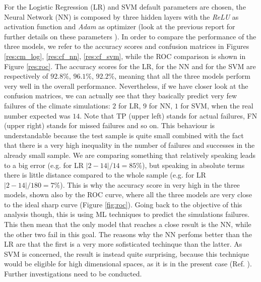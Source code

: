 \documentclass[english,notitlepage,reprint,nofootinbib]{revtex4-1}  %
\begin{document}
For the Logistic Regression (LR) and SVM default parameters are chosen, the Neural Network (NN) is composed by three hidden layers with the \textit{ReLU} as activation function and \textit{Adam} as optimizer (look at the previous report for further details on these parameters \cite{adele}). In order to compare the performance of the three models, we refer to the accuracy scores and confusion matrices in Figures \ref{res:cm_log}, \ref{res:cf_nn}, \ref{res:cf_svm}, while the ROC comparison is shown in Figure \ref{res:roc}. The accuracy scores for the LR, for the NN and for the SVM are respectively of $92.8\%$, $96.1\%$, $92.2\%$, meaning that all the three models perform very well in the overall performance. Nevertheless, if we have closer look at the confusion matrices, we can actually see that they basically predict very few failures of the climate simulations: $2$ for LR, $9$ for NN, $1$ for SVM, when the real number expected was $14$. Note that TP (upper left) stands for actual failures, FN (upper right) stands for missed failures and so on. This behaviour is understandable because the test sample is quite small combined with the fact that there is a very high inequality in the number of failures and successes in the already small sample. We are comparing something that relatively speaking leads to a big error (e.g. for LR $|2-14|/14=85\%$), but speaking in absolute terms there is little distance compared to the whole sample (e.g. for LR $|2-14|/180=7\%$). This is why the accuracy score in very high in the three models, shown also by the ROC curve, where all the three models are very close to the ideal sharp curve (Figure \ref{fig:roc}). Going back to the objective of this analysis though, this is using ML techniques to predict the simulations failures. This then mean that the only model that reaches a close result is the NN, while the other two fail in this goal. The reasons why the NN perfoms better than the LR are that the first is a very more sofisticated techinque than the latter. As SVM is concerned, the result is instead quite surprising, because this technique would be eligible for high dimensional spaces, as it is in the present case (Ref. \cite{svm5}). Further investigations need to be conducted.
\end{document}

